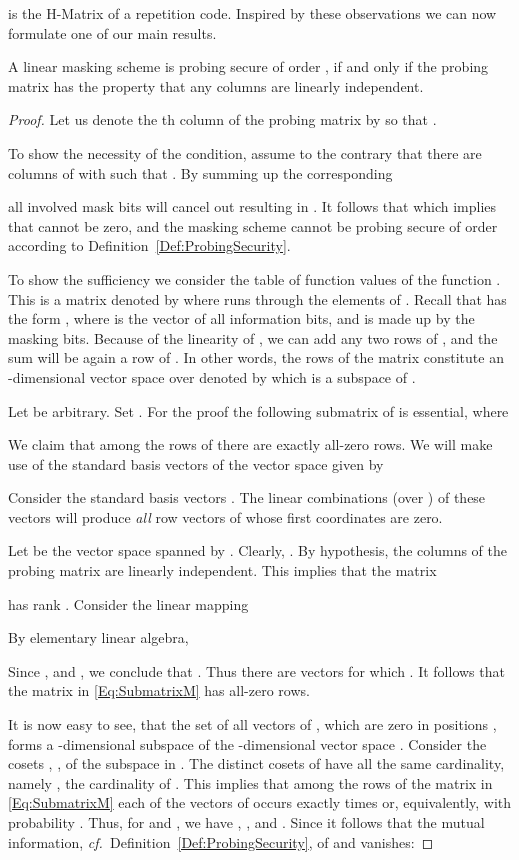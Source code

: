 \documentclass[11pt]{llncs}
\newcommand{\cf}{{\it cf.\ }}
\newcommand{\QED}{\hfill }
\begin{document}
is the H-Matrix of a repetition code.
Inspired by these observations we can now formulate one of our main results.
\begin{theorem}\label{Th:ProbingMatrix}
A linear masking scheme is probing secure of order ,
if and only if the probing matrix 
has the property that any  columns are linearly independent.
\end{theorem}
\begin{proof}
Let us denote the th column of the probing matrix
by  so that .

To show the necessity of the condition,
assume to the contrary that there are  columns of
 with  such that .
By summing up the corresponding

all involved mask bits  will cancel out resulting in
.
It follows that 
which implies that 
cannot be zero, and the masking scheme cannot be
probing secure of order  according to Definition~\ref{Def:ProbingSecurity}.

To show the sufficiency we consider the table of function
values of the function .
This is a  matrix denoted by
 where 
runs through the elements of .
Recall that  has the form ,
where
 is the vector of all  information bits, and
 is made up by the  masking bits.
Because of the linearity of ,
we can add any two rows of ,
and the sum will be again a row of .
In other words, the rows of the matrix 
constitute an -dimensional vector space over 
denoted by  which is a subspace
of .

Let  be arbitrary.
Set .
For the proof the following  submatrix  of
 is essential, where

We claim that among the  rows of  there are exactly  all-zero rows.
We will make use of the standard basis vectors of the vector space  given by

Consider the  standard basis vectors . The  linear combinations (over ) of these vectors will
produce \emph{all} row vectors of  whose first  coordinates are zero.

Let  be the vector space spanned by
.
Clearly, .
By hypothesis, the  columns
 of the probing matrix  are linearly independent.
This implies that the matrix

has rank .
Consider the linear mapping

By elementary linear algebra,

Since , and ,
we conclude that
.
Thus there are  vectors  for which
.
It follows that the matrix  in \eqref{Eq:SubmatrixM}
has  all-zero rows.

It is now easy to see, that the set  of all vectors of ,
which are zero in positions
,
forms a -dimensional subspace of the -dimensional vector  space .
Consider the cosets , , of the subspace  in .
The distinct cosets of  have all the same cardinality,
namely , the cardinality of . This implies that
among the  rows of the matrix  in \eqref{Eq:SubmatrixM}
each of the vectors of 
occurs exactly  times or, equivalently,
with probability . Thus, for
 and ,
we have , , and .
Since  it follows that the mutual information,
\cf Definition~\ref{Def:ProbingSecurity},
of  and  vanishes:

\QED
\end{proof}
\end{document}
